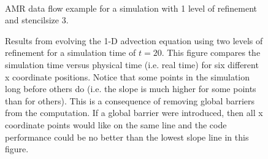 \documentclass[prd,aps,showpacs,nofootinbib,floats,floatfix,twocolumn,letterpaper]{revtex4}
\begin{document}
\begin{widetext}
\begin{figure}
 \\
\caption{AMR data flow example for a simulation with 1 level of refinement and stencilsize 3.
} \label{fig:amr_dataflow}
\end{figure}

\begin{figure}
\caption{Results from evolving the 1-D advection equation using two levels of refinement for a simulation time of $t=20$.
This figure compares the simulation time versus physical time (i.e. real time) for six different x coordinate 
positions.  Notice that some points in the simulation long before others do (i.e. the slope is much higher for some points
than for others).  This is 
a consequence of removing global barriers from the computation.  If a global barrier were introduced, then all
x coordinate points would like on the same line and the code performance could be no better 
than the lowest slope line in this figure.}
\label{fig:no_barriers}
\end{figure}

\end{widetext}

%
%
\end{document}
